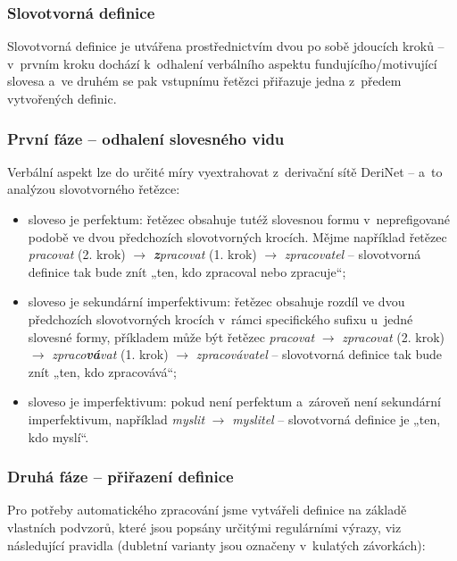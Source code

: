 \hypertarget{slovotvornuxe1-definice}{%
\subsubsection{Slovotvorná definice}\label{slovotvornuxe1-definice}}

Slovotvorná definice je utvářena prostřednictvím dvou po sobě jdoucích
kroků -- v~prvním kroku dochází k~odhalení verbálního aspektu
fundujícího/motivující slovesa a~ve druhém se pak vstupnímu řetězci
přiřazuje jedna z~předem vytvořených definic.

\hypertarget{prvni-faze}{%
\subsubsection*{První fáze -- odhalení slovesného vidu}\label{prvni-faze}}

Verbální aspekt lze do určité míry vyextrahovat z~derivační sítě DeriNet
-- a~to analýzou slovotvorného řetězce:

\begin{itemize}
\tightlist
\item
  sloveso je perfektum: řetězec obsahuje tutéž slovesnou formu
v~neprefigované podobě ve dvou předchozích slovotvorných krocích. Mějme
  například řetězec \emph{pracovat} (2. krok) $\rightarrow$
  \emph{\textbf{z}pracovat} (1. krok) $\rightarrow$
  \emph{zpracovatel} -- slovotvorná definice tak bude znít „ten, kdo
  zpracoval nebo zpracuje``;
\item
  sloveso je sekundární imperfektivum: řetězec obsahuje rozdíl ve dvou
  předchozích slovotvorných krocích v~rámci specifického sufixu u~jedné
  slovesné formy, příkladem může být řetězec \emph{pracovat}
  $\rightarrow$ \emph{zpracovat} (2. krok) $\rightarrow$
  \emph{zpraco\textbf{vá}vat} (1. krok) $\rightarrow$
  \emph{zpracovávatel} -- slovotvorná definice tak bude znít „ten, kdo
  zpracovává``;
\item
  sloveso je imperfektivum: pokud není perfektum a~zároveň není
  sekundární imperfektivum, například \emph{myslit} $\rightarrow$
  \emph{myslitel} -- slovotvorná definice je „ten, kdo myslí``.
\end{itemize}

\hypertarget{druha-faze}{%
\subsubsection*{Druhá fáze -- přiřazení definice}\label{druha-faze}}

Pro potřeby automatického zpracování jsme vytvářeli definice na základě
vlastních podvzorů, které jsou popsány určitými regulárními výrazy, viz
následující pravidla (dubletní varianty jsou označeny v~kulatých
závorkách):

